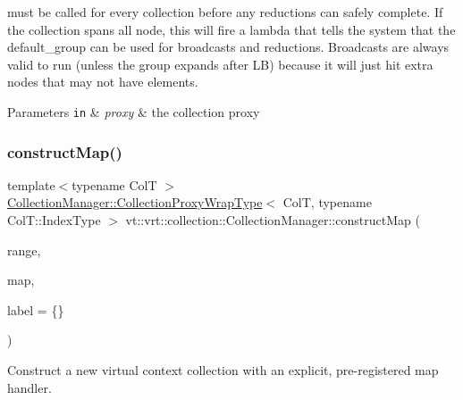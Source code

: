 must be called for every collection before any reductions can safely complete. If the collection spans all node, this will fire a lambda that tells the system that the {\ttfamily default\+\_\+group} can be used for broadcasts and reductions. Broadcasts are always valid to run (unless the group expands after LB) because it will just hit extra nodes that may not have elements.


\begin{DoxyParams}[1]{Parameters}
\mbox{\tt in}  & {\em proxy} & the collection proxy \\
\hline
\end{DoxyParams}
\mbox{\label{structvt_1_1vrt_1_1collection_1_1_collection_manager_ac9e0c4bfb1865ebb014ca0dc4b9006f8}} 
\subsubsection{\texorpdfstring{construct\+Map()}{constructMap()}}
{\footnotesize\ttfamily template$<$typename ColT $>$ \\
\hyperlink{structvt_1_1vrt_1_1collection_1_1_collection_manager_a56458ed7f9bb22b631b9b3a745f42f94}{Collection\+Manager\+::\+Collection\+Proxy\+Wrap\+Type}$<$ ColT, typename Col\+T\+::\+Index\+Type $>$ vt\+::vrt\+::collection\+::\+Collection\+Manager\+::construct\+Map (\begin{DoxyParamCaption}\item[{typename Col\+T\+::\+Index\+Type}]{range,  }\item[{\hyperlink{namespacevt_af64846b57dfcaf104da3ef6967917573}{Handler\+Type} const}]{map,  }\item[{std\+::string const \&}]{label = {\ttfamily \{\}} }\end{DoxyParamCaption})}



Construct a new virtual context collection with an explicit, pre-\/registered map handler. 


